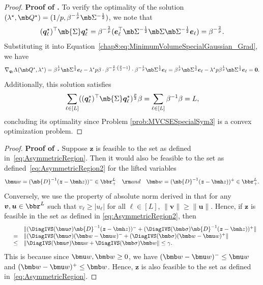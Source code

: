 \documentclass[opre, blindrev]{informs4}
\newcommand{\1}[1]{\mathds{1}{\left(#1\right)}}
\begin{document}
\begin{appendices}
\begin{proof}{\bf Proof of .}
To verify the optimality of the solution $(\lambda^\star, \mb Q^\star) = (1/p, \beta^{- \frac{1}{p}} \mb \Sigma^{-\frac{1}{2}})$, we note that
$$
(\bm q^\star_\ell)^\top \mb{\Sigma} \bm q^\star_\ell = \beta^{-\frac{2}{p}} ( \bm e_{\ell}^\top \mb \Sigma^{-\frac{1}{2}} \mb \Sigma \mb \Sigma^{-\frac{1}{2}} \bm e_{\ell}) = \beta^{-\frac{2}{p}}.
$$
Substituting it into Equation~\eqref{chap8:eq:MinimumVolumeSpecialGaussian_Grad}, we have
$$
\nabla_{\bm q_\ell} \Lambda (\mb Q^\star, \lambda^\star) = \beta^{\frac{1}{p}} \mb \Sigma^{\frac{1}{2}} \bm e_{\ell}  - \lambda^\star p \beta \cdot \beta^{-\frac{2}{p} \cdot \left(\frac{p}{2} -1 \right)}\cdot \beta^{-\frac{1}{p}} \mb \Sigma^{\frac{1}{2}}  \bm e_{\ell} = \beta^{\frac{1}{p}} \mb \Sigma^{\frac{1}{2}} \bm e_{\ell}  - \lambda^\star p \beta^{\frac{1}{p}} \mb \Sigma^{\frac{1}{2}} \bm e_{\ell} = \bm 0.
$$
Additionally, this solution satisfies
$$
\sum_{\ell \in [L]} ( (\bm q_\ell^\star)^\top \mb{\Sigma} \bm q_\ell^\star )^{\frac{p}{2}} \beta = \sum_{\ell \in [L]} \beta^{-1} \beta =  L,
$$
concluding its optimality since Problem \eqref{prob:MVCSESpecialSym3} is a convex optimization problem.
\hfill \Halmos
\end{proof}
\vspace{3mm}

\begin{proof}{\bf Proof of .}
Suppose $\bm z$ is feasible to the set as defined in~\eqref{eq:AsymmetricRegion}. Then it would also be feasible to the set as defined~\eqref{eq:AsymmetricRegion2} for the lifted variables
$$
\bmu w = (\mb{D}^{-1} (\bm z - \bmh  z))^- \in \bbr^L_+
~~~{\rm and}~~~
\bmb w= (\mb{D}^{-1} (\bm z - \bmh  z))^+ \in \bbr^L_+.
$$
Conversely, we use the property of absolute norm derived in \cite{bertsimas2006tractable} that for any $\bm v, \bm u \in \bbr^L$ such that $v_\ell\geq |u_\ell|$ for all $\ell \in [L]$, $\|\bm v\|\geq \|\bm u\|$. Hence, if $\bm z$ is feasible in the set as defined in \eqref{eq:AsymmetricRegion2}, then 
$$
\begin{array}{rcl}
&& \| (\DiagIVS(\bmu \sigma) \mb{D}^{-1} (\bm z - \bmh  z))^- + (\DiagIVS(\bmb \sigma) \mb{D}^{-1} (\bm z - \bmh  z))^+ \|\\
&=&   \| (\DiagIVS(\bmu \sigma) (\bmb w - \bmu w)^- + (\DiagIVS(\bmb \sigma) (\bmb w - \bmu w)^+  \| \\
&\leq& \|\DiagIVS(\bmu \sigma) \bmu w + \DiagIVS(\bmb \sigma) \bmb w\| \leq \gamma.
\end{array}
$$
This is because since $\bmu w, \bmb w \geq 0$, we have $(\bmb w - \bmu w)^- \leq \bmu w$ and $(\bmb w - \bmu w)^+ \leq \bmb w$.
Hence, $\bm z$ is also feasible to the set as defined in~\eqref{eq:AsymmetricRegion}.
\hfill \Halmos    
\end{proof}
\vspace{3mm}


\end{appendices}
\end{document}
